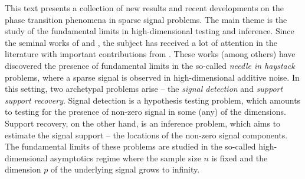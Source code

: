 
\preface



%
 


This text presents a collection of new results and recent developments on the phase transition phenomena in sparse signal problems.
The main theme is the study of the fundamental limits in high-dimensional testing and inference. Since the seminal works
of \cite{ingster1998minimax} and \cite{donoho2004higher}, the subject has received a lot of attention in the literature with important contributions
from .  These works (among others) have discovered the presence of fundamental limits in the so-called 
{\em needle in haystack} problems, where a sparse signal is observed in high-dimensional additive noise.  In this setting, two archetypal 
problems arise -- the {\em signal detection} and {\em support support recovery}.  Signal detection is a hypothesis testing problem, which amounts
to testing for the presence of non-zero signal in some (any) of the dimensions.  Support recovery, on the other hand, is an inference problem, which aims to estimate the signal support -- the locations of the non-zero signal components.  The fundamental limits of these problems are studied in the so-called high-dimensional asymptotics regime where the sample size $n$ is fixed and the dimension $p$ of the underlying signal 
grows to infinity.   

